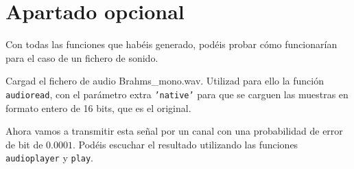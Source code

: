 \documentclass[es,practica,12pt]{uah}
\begin{document}
\section{Apartado opcional}

Con todas las funciones que habéis generado, podéis probar cómo funcionarían para el caso de un fichero de sonido. 

Cargad el fichero de audio Brahms\_mono.wav. Utilizad para ello la función \texttt{audioread}, con el parámetro extra \texttt{'native'} para que se carguen las muestras en formato entero de 16 bits, que es el original.

Ahora vamos a transmitir esta señal por un canal con una probabilidad de error de bit de $0.0001$. Podéis escuchar el resultado utilizando las funciones \texttt{audioplayer} y \texttt{play}. 
\end{document}
